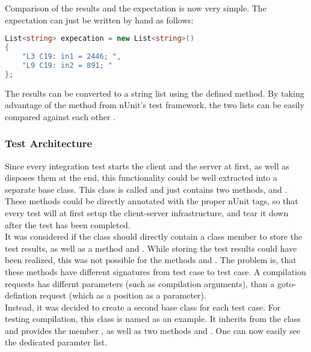 Comparison of the results and the expectation is now very simple. The expectation can just be written by hand as follows:

\begin{lstlisting}[language=csharp, caption={Expectation}, captionpos=b, label={lst:testexpectation}]
List<string> expecation = new List<string>()
{
    "L3 C19: in1 = 2446; ",
    "L9 C19: in2 = 891; "
};
\end{lstlisting}

The results can be converted to a string list using the defined  method. By taking advantage of the method  from nUnit's test framework, the two lists can be easily compared against each other \cite{nunitCollectionAssert}.

\subsubsection{Test Architecture}
Since every integration test starts the client and the server at first, as well as disposes them at the end, this functionality could be well extracted into a separate base class. This class is called  and just contains two methods,  and . These methods could be directly annotated with the proper nUnit tags, so that every test will at first setup the client-server infrastructure, and tear it down after the test has been completed.\\
It was considered if the  class should directly contain a class member\linebreak {} to store the test results, as well as a method  and . While storing the test results could have been realized, this was not possible for the methods  and . The problem is, that these methods have different signatures from test case to test case. A compilation requests has differnt parameters (such as compilation arguments), than a goto-defintion request (which as a position as a parameter).\\
Instead, it was decided to create a second base class for each test case. For testing compilation, this class is named  as an example. It inherits from the  class and provides the member , as well as two methods  and . One can now easily see the dedicated paramter list.\\
